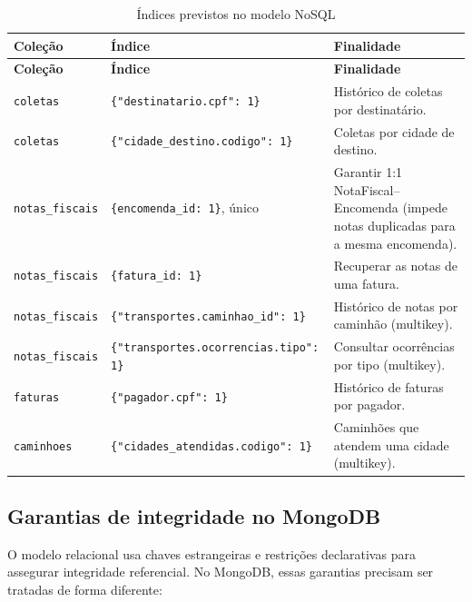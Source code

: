 {\small
\begin{longtable}{@{}L{2.8cm}L{6.0cm}L{6.2cm}@{}}
\caption{Índices previstos no modelo NoSQL}
\label{tab:indices}\\
\toprule
\textbf{Coleção} & \textbf{Índice} & \textbf{Finalidade}\\
\midrule
\endfirsthead
\toprule
\textbf{Coleção} & \textbf{Índice} & \textbf{Finalidade}\\
\midrule
\endhead
\bottomrule
\endfoot

\texttt{coletas} & \texttt{\{"destinatario.cpf": 1\}} & Histórico de coletas por destinatário.\\
\texttt{coletas} & \texttt{\{"cidade\_destino.codigo": 1\}} & Coletas por cidade de destino.\\
\texttt{notas\_fiscais} & \texttt{\{encomenda\_id: 1\}}, único & Garantir 1:1 NotaFiscal--Encomenda (impede notas duplicadas para a mesma encomenda).\\
\texttt{notas\_fiscais} & \texttt{\{fatura\_id: 1\}} & Recuperar as notas de uma fatura.\\
\texttt{notas\_fiscais} & \texttt{\{"transportes.\allowbreak caminhao\_id": 1\}} & Histórico de notas por caminhão (multikey).\\
\texttt{notas\_fiscais} & \texttt{\{"transportes.\allowbreak ocorrencias.\allowbreak tipo": 1\}} & Consultar ocorrências por tipo (multikey).\\
\texttt{faturas} & \texttt{\{"pagador.cpf": 1\}} & Histórico de faturas por pagador.\\
\texttt{caminhoes} & \texttt{\{"cidades\_atendidas.\allowbreak codigo": 1\}} & Caminhões que atendem uma cidade (multikey).\\
\end{longtable}
}

\subsection{Garantias de integridade no MongoDB}

O modelo relacional usa chaves estrangeiras e restrições declarativas para assegurar integridade referencial. No MongoDB, essas garantias precisam ser tratadas de forma diferente:

